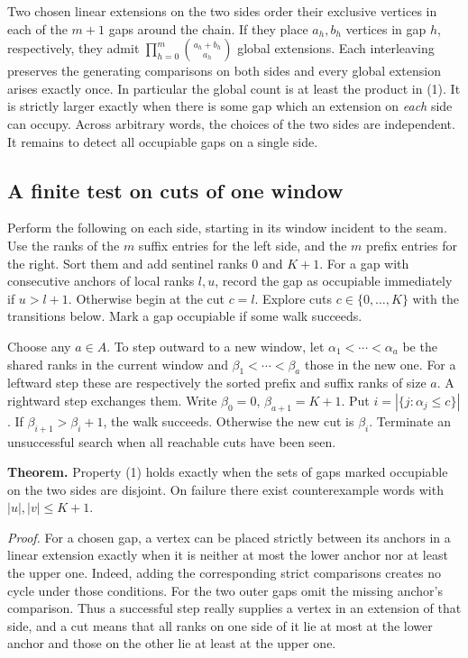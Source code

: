 \documentclass[11pt]{article}
\begin{document}
Two chosen linear extensions on the two sides order their exclusive vertices in each of the $m+1$ gaps around the chain. If they place $a_h,b_h$ vertices in gap $h$, respectively, they admit $\prod_{h=0}^{m}\binom{a_h+b_h}{a_h}$ global extensions. Each interleaving preserves the generating comparisons on both sides and every global extension arises exactly once. In particular the global count is at least the product in (1). It is strictly larger exactly when there is some gap which an extension on \emph{each} side can occupy. Across arbitrary words, the choices of the two sides are independent. It remains to detect all occupiable gaps on a single side.

\subsection*{A finite test on cuts of one window}
Perform the following on each side, starting in its window incident to the seam. Use the ranks of the $m$ suffix entries for the left side, and the $m$ prefix entries for the right. Sort them and add sentinel ranks $0$ and $K+1$. For a gap with consecutive anchors of local ranks $l,u$, record the gap as occupiable immediately if $u>l+1$. Otherwise begin at the cut $c=l$. Explore cuts $c\in\{0,\ldots,K\}$ with the transitions below. Mark a gap occupiable if some walk succeeds.

Choose any $a\in A$. To step outward to a new window, let $\alpha_1<\cdots<\alpha_a$ be the shared ranks in the current window and $\beta_1<\cdots<\beta_a$ those in the new one. For a leftward step these are respectively the sorted prefix and suffix ranks of size $a$. A rightward step exchanges them. Write $\beta_0=0$, $\beta_{a+1}=K+1$. Put $i=|\{j:\alpha_j\le c\}|$. If $\beta_{i+1}>\beta_i+1$, the walk succeeds. Otherwise the new cut is $\beta_i$. Terminate an unsuccessful search when all reachable cuts have been seen.

\textbf{Theorem.} Property (1) holds exactly when the sets of gaps marked occupiable on the two sides are disjoint. On failure there exist counterexample words with $|u|,|v|\le K+1$.

\textit{Proof.} For a chosen gap, a vertex can be placed strictly between its anchors in a linear extension exactly when it is neither at most the lower anchor nor at least the upper one. Indeed, adding the corresponding strict comparisons creates no cycle under those conditions. For the two outer gaps omit the missing anchor's comparison. Thus a successful step really supplies a vertex in an extension of that side, and a cut means that all ranks on one side of it lie at most at the lower anchor and those on the other lie at least at the upper one.
\end{document}
